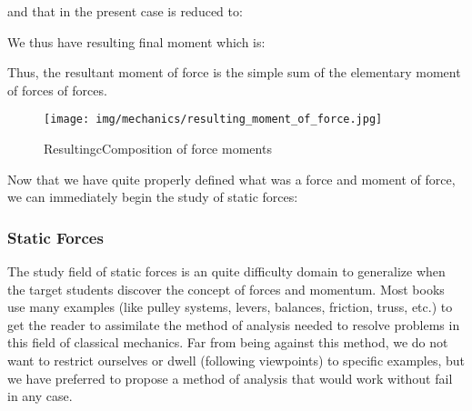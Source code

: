 	and that in the present case is reduced to:
	
	We thus have resulting final moment which is:
	
	Thus, the resultant moment of force is the simple sum of the elementary moment of forces of forces.
	\begin{figure}[H]
		\centering
		\texttt{[image: img/mechanics/resulting\_moment\_of\_force.jpg]}
		\caption[]{ResultingcComposition of force moments}
	\end{figure}
	Now that we have quite properly defined what was a force and moment of force, we can immediately begin the study of static forces:
	
	\pagebreak
	\subsubsection{Static Forces}
	The study field of static forces is an quite difficulty domain to generalize when the target students discover the concept of forces and momentum. Most books use many examples (like pulley systems, levers, balances, friction, truss, etc.) to get the reader to assimilate the method of analysis needed to resolve problems in this field of classical mechanics. Far from being against this method, we do not want to restrict ourselves or dwell (following viewpoints) to specific examples, but we have preferred to propose a method of analysis that would work without fail in any case.
	
